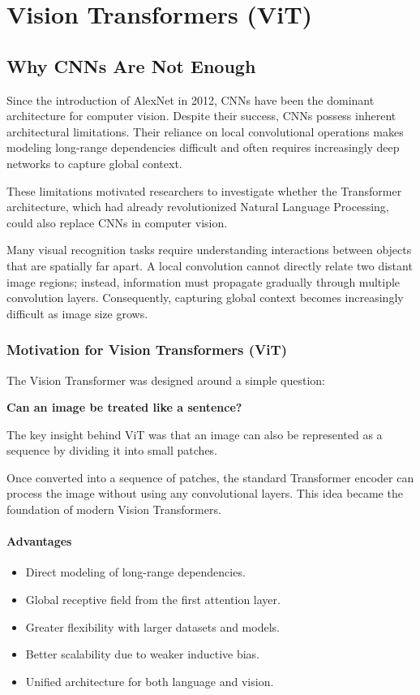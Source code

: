 \chapter{Vision Transformers (ViT)}

\section{Why CNNs Are Not Enough}

Since the introduction of AlexNet in 2012, CNNs have been the dominant architecture for computer vision. Despite their success, CNNs possess inherent architectural limitations. Their reliance on local convolutional operations makes modeling long-range dependencies difficult and often requires increasingly deep networks to capture global context.

These limitations motivated researchers to investigate whether the Transformer architecture, which had already revolutionized Natural Language Processing, could also replace CNNs in computer vision.

Many visual recognition tasks require understanding interactions between objects that are spatially far apart. A local convolution cannot directly relate two distant image regions; instead, information must propagate gradually through multiple convolution layers. Consequently, capturing global context becomes increasingly difficult as image size grows.

\subsection{Motivation for Vision Transformers (ViT)}

The Vision Transformer was designed around a simple question:
\begin{center}
\textbf{Can an image be treated like a sentence?}
\end{center}

The key insight behind ViT was that an image can also be represented as a sequence by dividing it into small patches.

Once converted into a sequence of patches, the standard Transformer encoder can process the image without using any convolutional layers. This idea became the foundation of modern Vision Transformers.

\subsubsection*{Advantages}
\begin{itemize}
    \item Direct modeling of long-range dependencies.
    \item Global receptive field from the first attention layer.
    \item Greater flexibility with larger datasets and models.
    \item Better scalability due to weaker inductive bias.
    \item Unified architecture for both language and vision.
\end{itemize}

